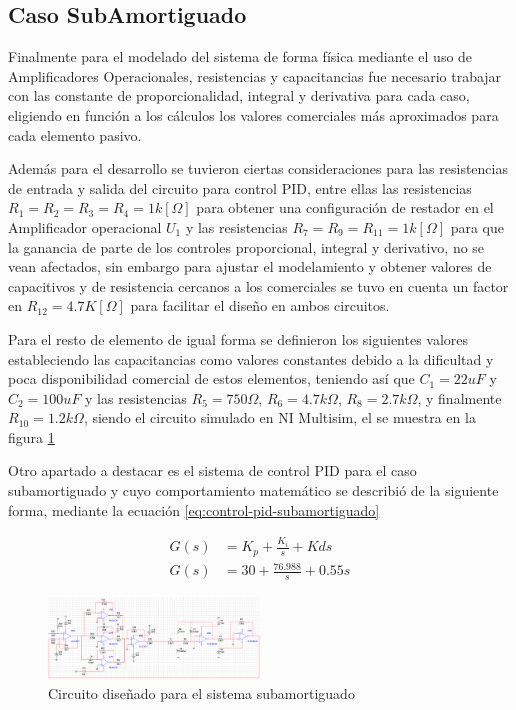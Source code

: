\documentclass[conference]{IEEEtran}
\begin{document}
	\subsection{Caso SubAmortiguado}
	
	Finalmente para el modelado del sistema de forma física mediante el uso de Amplificadores Operacionales, resistencias y capacitancias fue necesario trabajar con las constante de proporcionalidad, integral y derivativa para cada caso, eligiendo en función a los cálculos los valores comerciales más aproximados para cada elemento pasivo.
	
	Además para el desarrollo se tuvieron ciertas consideraciones para las resistencias de entrada y salida del circuito para control PID, entre ellas las resistencias $R_1 = R_2 = R_3 = R_4 = 1k[\Omega]$ para obtener una configuración de restador en el Amplificador operacional $U_1$ y las resistencias $R_7 = R_9 = R_11 = 1k [\Omega]$ para que la ganancia de parte de los controles proporcional, integral y derivativo, no se vean afectados, sin embargo para ajustar el modelamiento y obtener valores de capacitivos y de resistencia cercanos a los comerciales se tuvo en cuenta un factor en $R_12 = 4.7K [\Omega]$ para facilitar el diseño en ambos circuitos.
	
	Para el resto de elemento de igual forma se definieron los siguientes valores estableciendo las capacitancias como valores constantes debido a la dificultad y poca disponibilidad comercial de estos elementos, teniendo así que $C_1 = 22uF$ y $C_2 = 100uF$ y las resistencias $R_5 = 750\Omega$, $R_6 = 4.7k\Omega$, $R_8 = 2.7k\Omega$, y finalmente $R_10 = 1.2k\Omega$, siendo el circuito simulado en NI Multisim, el se muestra en la figura \ref{fig:circuito-subamortiguado}
	
	Otro apartado a destacar es el sistema de control PID para el caso subamortiguado y cuyo comportamiento matemático se describió de la siguiente forma, mediante la ecuación \ref{eq:control-pid-subamortiguado}
	
	\begin{align}
		G(s) &= K_p +  \frac{K_i}{s} + Kds \\
		G(s) &= 30 +  \frac{76.988}{s} + 0.55s
		\label{eq:control-pid-subamortiguado}
	\end{align}
	
	\begin{figure}[h]
		\centering
		\includegraphics[width=0.5\textwidth]{media1/circuito-subamortiguado}
		\caption{Circuito diseñado para el sistema subamortiguado}
		\label{fig:circuito-subamortiguado}
	\end{figure}
	
\end{document}
